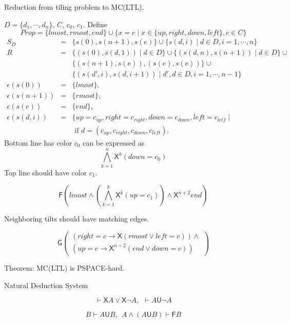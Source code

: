 \documentclass[12pt]{article}
\begin{document}
\begin{CJK*}{GBK}{song}
Reduction from tiling problem to MC(LTL).

$D=\{d_1,\cdots, d_n\}$, $C$, $c_0$, $c_1$. Define
$$Prop=\{lmost, rmost, end\}\cup\{x=c\mid x\in\{up, right, down, left\}, c\in C\}$$
%
%
$$\begin{array}{lll}S_D&=&\{s(0), s(n+1), s(e)\}\cup\{s{(d,i)}\mid d\in D, i=1,\cdots,n\}\\

R&=&\{(s(0),s(d,1))\mid d\in D\}\cup\{(s(d,n), s(n+1))\mid d\in D\}\cup\\ &&\{(s(n+1),s(e)), (s(e),s(e))\}\cup\\ && \{(s(d',i),s(d,i+1))\mid d',d\in D, i=1,\cdots,n-1\}\\
\epsilon(s(0))&=&\{lmost\},\\ \epsilon(s(n+1))&=&\{rmost\},\\ \epsilon(s(e))&=&\{end\},\\
\epsilon(s(d,i))&=&\{up=c_{up}, right=c_{right}, down=c_{down}, left=c_{letf}\mid \\ &&\mbox{ if }d=(c_{up}, c_{right}, c_{down}, c_{left}).
\end{array}$$
%
Bottom line has color $c_0$ can be expressed as
$$ \bigwedge_{k=1}^n \textsf{X}^k(down=c_0)$$
Top line should have color $c_1$. %

$$\textsf{F}\left(lmost\wedge \left(\bigwedge_{k=1}^k \textsf{X}^k(up=c_1)\right)\wedge \textsf{X}^{n+2}end
\right)$$

Neighboring tilts should have matching edges. %

$$\textsf{G}\left(\begin{array}{l}
(right=c\rightarrow \textsf{X}(rmost\vee left=c))\wedge\\
(up=c\rightarrow \textsf{X}^{n+2}(end\vee down=c))\end{array}
\right)$$


Theorem: MC(LTL) is PSPACE-hard.





Natural Deduction System

$$\vdash\textsf{X}A\vee \textsf{X}\neg A,\ \ \vdash A\textsf{U}\neg A$$

$${B}\vdash {A\textsf{U} B}, \ \ A\wedge (A\textsf{U}B)\vdash \textsf{F}B$$


\end{CJK*}
\end{document}
